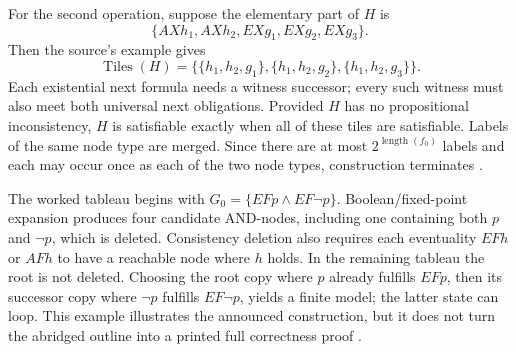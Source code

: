 For the second operation, suppose the elementary part of \(H\) is
\[
 \{AXh_1,AXh_2,EXg_1,EXg_2,EXg_3\}.
\]
Then the source's example gives
\[
 \operatorname{Tiles}(H)
 =
 \bigl\{
   \{h_1,h_2,g_1\},
   \{h_1,h_2,g_2\},
   \{h_1,h_2,g_3\}
 \bigr\}.
\]
Each existential next formula needs a witness successor; every such witness
must also meet both universal next obligations.  Provided \(H\) has no
propositional inconsistency, \(H\) is satisfiable exactly when all of these
tiles are satisfiable.  Labels of the same node type are merged.  Since there
are at most \(2^{\operatorname{length}(f_0)}\) labels and each may occur once
as each of the two node types, construction terminates
\cite[pp.~60--62]{ClarkeEmerson1981}.

The worked tableau begins with
\(G_0=\{EFp\land EF\neg p\}\).  Boolean/fixed-point expansion produces four
candidate AND-nodes, including one containing both \(p\) and \(\neg p\),
which is deleted.  Consistency deletion also requires each eventuality
\(EFh\) or \(AFh\) to have a reachable node where \(h\) holds.  In the
remaining tableau the root is not deleted.  Choosing the root copy where
\(p\) already fulfills \(EFp\), then its successor copy where
\(\neg p\) fulfills \(EF\neg p\), yields a finite model; the latter state can
loop.  This example illustrates the announced construction, but it does not
turn the abridged outline into a printed full correctness proof
\cite[pp.~61--63]{ClarkeEmerson1981}.

